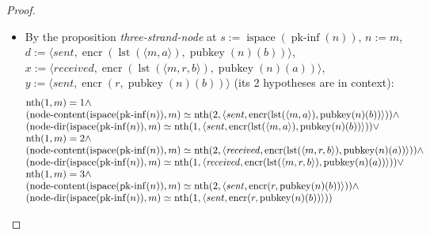 \documentclass[11pt]{article}
\theoremstyle{plain}
\begin{document}
\begin{proof}
\begin{itemize}[leftmargin=2.8em, itemsep=4pt, parsep=1pt]
\begin{itemize}[leftmargin=2.8em, itemsep=4pt, parsep=1pt]
  \item[\textbf{365}] By the proposition \emph{three-strand-node} at $s := \operatorname{ispace}(\operatorname{pk\text{-}inf}(n))$, $n := m$, $d := \langle \mathit{sent}, \operatorname{encr}(\operatorname{lst}(\langle m, a \rangle), \operatorname{pubkey}(n)(b)) \rangle$, $x := \langle \mathit{received}, \operatorname{encr}(\operatorname{lst}(\langle m, r, b \rangle), \operatorname{pubkey}(n)(a)) \rangle$, $y := \langle \mathit{sent}, \operatorname{encr}(r, \operatorname{pubkey}(n)(b)) \rangle$ (its 2 hypotheses are in context):
\begin{equation*}
\begin{array}{@{}l@{}} \operatorname{nth}(1, m) = 1 \wedge \\ (\operatorname{node\text{-}content}(\operatorname{ispace}(\operatorname{pk\text{-}inf}(n)), m) \simeq \operatorname{nth}(2, \langle \mathit{sent}, \operatorname{encr}(\operatorname{lst}(\langle m, a \rangle), \operatorname{pubkey}(n)(b)) \rangle)) \wedge \\ (\operatorname{node\text{-}dir}(\operatorname{ispace}(\operatorname{pk\text{-}inf}(n)), m) \simeq \operatorname{nth}(1, \langle \mathit{sent}, \operatorname{encr}(\operatorname{lst}(\langle m, a \rangle), \operatorname{pubkey}(n)(b)) \rangle)) \vee \\ \operatorname{nth}(1, m) = 2 \wedge \\ (\operatorname{node\text{-}content}(\operatorname{ispace}(\operatorname{pk\text{-}inf}(n)), m) \simeq \operatorname{nth}(2, \langle \mathit{received}, \operatorname{encr}(\operatorname{lst}(\langle m, r, b \rangle), \operatorname{pubkey}(n)(a)) \rangle)) \wedge \\ (\operatorname{node\text{-}dir}(\operatorname{ispace}(\operatorname{pk\text{-}inf}(n)), m) \simeq \operatorname{nth}(1, \langle \mathit{received}, \operatorname{encr}(\operatorname{lst}(\langle m, r, b \rangle), \operatorname{pubkey}(n)(a)) \rangle)) \vee \\ \operatorname{nth}(1, m) = 3 \wedge \\ (\operatorname{node\text{-}content}(\operatorname{ispace}(\operatorname{pk\text{-}inf}(n)), m) \simeq \operatorname{nth}(2, \langle \mathit{sent}, \operatorname{encr}(r, \operatorname{pubkey}(n)(b)) \rangle)) \wedge \\ (\operatorname{node\text{-}dir}(\operatorname{ispace}(\operatorname{pk\text{-}inf}(n)), m) \simeq \operatorname{nth}(1, \langle \mathit{sent}, \operatorname{encr}(r, \operatorname{pubkey}(n)(b)) \rangle)) \end{array}
\end{equation*}


\end{itemize}
\end{itemize}
\end{proof}
\end{document}
